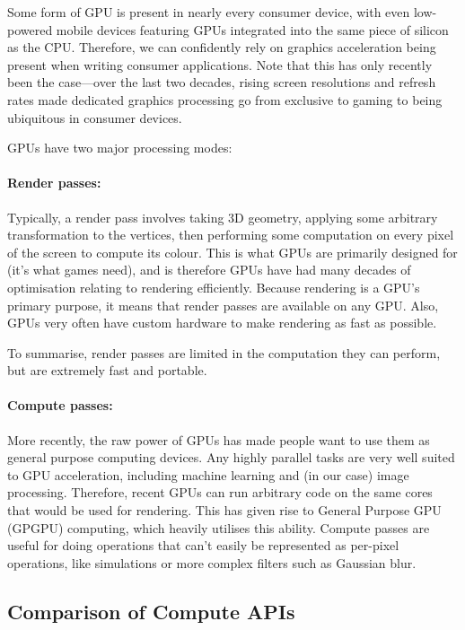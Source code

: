 \documentclass[12pt]{article}
\begin{document}
Some form of GPU is present in nearly every consumer device, with even low-powered mobile devices
featuring GPUs integrated into the same piece of silicon as the CPU.  Therefore, we can confidently
rely on graphics acceleration being present when writing consumer applications.  Note that this has
only recently been the case---over the last two decades, rising screen resolutions and refresh
rates made dedicated graphics processing go from exclusive to gaming to being ubiquitous in consumer
devices.

GPUs have two major processing modes:

\paragraph{Render passes:} Typically, a render pass involves taking 3D geometry, applying some
arbitrary transformation to the vertices, then performing some computation on every pixel of the
screen to compute its colour.  This is what GPUs are primarily designed for (it's what games need),
and is therefore GPUs have had many decades of optimisation relating to rendering efficiently.
Because rendering is a GPU's primary purpose, it means that render passes are available on any GPU.
Also, GPUs very often have custom hardware to make rendering as fast as possible.

To summarise, render passes are limited in the computation they can perform, but are extremely fast
and portable.  

\paragraph{Compute passes:} More recently, the raw power of GPUs has made people want to use them as
general purpose computing devices.  Any highly parallel tasks are very well suited to GPU
acceleration, including machine learning and (in our case) image processing.  Therefore, recent GPUs
can run arbitrary code on the same cores that would be used for rendering.  This has given rise to
General Purpose GPU (GPGPU) computing, which heavily utilises this ability.  Compute passes are
useful for doing operations that can't easily be represented as per-pixel operations, like
simulations or more complex filters such as Gaussian blur.

\subsection{Comparison of Compute APIs}
\end{document}
